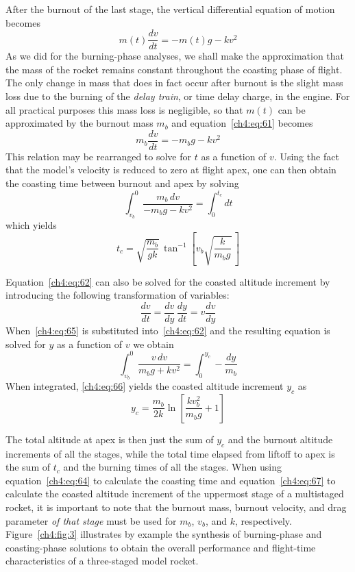 After the burnout of the last stage, the vertical differential equation of motion becomes
\begin{equation}\label{ch4:eq:61}
m(t)\frac{dv}{dt} = -m(t)g - kv^{2}
\end{equation}
As we did for the burning-phase analyses, we shall make the approximation that the mass of the rocket
remains constant throughout the coasting phase of flight. The only change in mass that does in fact occur
after burnout is the slight mass loss due to the burning of the \emph{delay train}, or time delay charge, in
the engine. For all practical purposes this mass loss is negligible, so that $m(t)$ can be approximated by
the burnout mass $m_b$ and equation~\eqref{ch4:eq:61} becomes
\begin{equation}\label{ch4:eq:62}
m_b\frac{dv}{dt} = -m_b g - kv^{2}
\end{equation}
This relation may be rearranged to solve for $t$ as a function of $v$. Using the fact that the model's
velocity is reduced to zero at flight apex, one can then obtain the coasting time between burnout and apex
by solving
\begin{equation}\label{ch4:eq:63}
\int_{v_b}^{0}\frac{m_b\,dv}{-m_b g - kv^{2}} = \int_{0}^{t_c} dt
\end{equation}
which yields
\begin{equation}\label{ch4:eq:64}
t_c = \sqrt{\frac{m_b}{gk}}\,\tan^{-1}\left[v_b\sqrt{\frac{k}{m_b g}}\,\right]
\end{equation}

Equation~\eqref{ch4:eq:62} can also be solved for the coasted altitude increment by introducing the
following transformation of variables:
\begin{equation}\label{ch4:eq:65}
\frac{dv}{dt} = \frac{dv}{dy}\,\frac{dy}{dt} = v\frac{dv}{dy}
\end{equation}
When~\eqref{ch4:eq:65} is substituted into~\eqref{ch4:eq:62} and the resulting equation is solved for $y$
as a function of $v$ we obtain
\begin{equation}\label{ch4:eq:66}
\int_{v_b}^{0}\frac{v\,dv}{m_b g + kv^{2}} = \int_{0}^{y_c} -\frac{dy}{m_b}
\end{equation}
When integrated, \eqref{ch4:eq:66} yields the coasted altitude increment $y_c$ as
\begin{equation}\label{ch4:eq:67}
y_c = \frac{m_b}{2k}\ln\left[\frac{kv_b^{2}}{m_b g} + 1\right]
\end{equation}

The total altitude at apex is then just the sum of $y_c$ and the burnout altitude increments of all the
stages, while the total time elapsed from liftoff to apex is the sum of $t_c$ and the burning times of all
the stages. When using equation~\eqref{ch4:eq:64} to calculate the coasting time and
equation~\eqref{ch4:eq:67} to calculate the coasted altitude increment of the uppermost stage of a
multistaged rocket, it is important to note that the burnout mass, burnout velocity, and drag parameter
\emph{of that stage} must be used for $m_b$, $v_b$, and $k$, respectively. Figure~\ref{ch4:fig:3}
illustrates by example the synthesis of burning-phase and coasting-phase solutions to obtain the overall
performance and flight-time characteristics of a three-staged model rocket.

